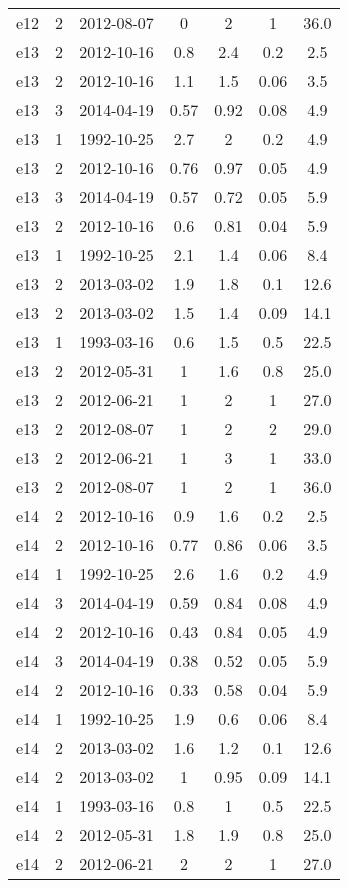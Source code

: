 \begin{longtable}{ccccccc}
e12 & 2 & 2012-08-07 & 0 & 2 & 1 & 36.0 \\
e13 & 2 & 2012-10-16 & 0.8 & 2.4 & 0.2 & 2.5 \\
e13 & 2 & 2012-10-16 & 1.1 & 1.5 & 0.06 & 3.5 \\
e13 & 3 & 2014-04-19 & 0.57 & 0.92 & 0.08 & 4.9 \\
e13 & 1 & 1992-10-25 & 2.7 & 2 & 0.2 & 4.9 \\
e13 & 2 & 2012-10-16 & 0.76 & 0.97 & 0.05 & 4.9 \\
e13 & 3 & 2014-04-19 & 0.57 & 0.72 & 0.05 & 5.9 \\
e13 & 2 & 2012-10-16 & 0.6 & 0.81 & 0.04 & 5.9 \\
e13 & 1 & 1992-10-25 & 2.1 & 1.4 & 0.06 & 8.4 \\
e13 & 2 & 2013-03-02 & 1.9 & 1.8 & 0.1 & 12.6 \\
e13 & 2 & 2013-03-02 & 1.5 & 1.4 & 0.09 & 14.1 \\
e13 & 1 & 1993-03-16 & 0.6 & 1.5 & 0.5 & 22.5 \\
e13 & 2 & 2012-05-31 & 1 & 1.6 & 0.8 & 25.0 \\
e13 & 2 & 2012-06-21 & 1 & 2 & 1 & 27.0 \\
e13 & 2 & 2012-08-07 & 1 & 2 & 2 & 29.0 \\
e13 & 2 & 2012-06-21 & 1 & 3 & 1 & 33.0 \\
e13 & 2 & 2012-08-07 & 1 & 2 & 1 & 36.0 \\
e14 & 2 & 2012-10-16 & 0.9 & 1.6 & 0.2 & 2.5 \\
e14 & 2 & 2012-10-16 & 0.77 & 0.86 & 0.06 & 3.5 \\
e14 & 1 & 1992-10-25 & 2.6 & 1.6 & 0.2 & 4.9 \\
e14 & 3 & 2014-04-19 & 0.59 & 0.84 & 0.08 & 4.9 \\
e14 & 2 & 2012-10-16 & 0.43 & 0.84 & 0.05 & 4.9 \\
e14 & 3 & 2014-04-19 & 0.38 & 0.52 & 0.05 & 5.9 \\
e14 & 2 & 2012-10-16 & 0.33 & 0.58 & 0.04 & 5.9 \\
e14 & 1 & 1992-10-25 & 1.9 & 0.6 & 0.06 & 8.4 \\
e14 & 2 & 2013-03-02 & 1.6 & 1.2 & 0.1 & 12.6 \\
e14 & 2 & 2013-03-02 & 1 & 0.95 & 0.09 & 14.1 \\
e14 & 1 & 1993-03-16 & 0.8 & 1 & 0.5 & 22.5 \\
e14 & 2 & 2012-05-31 & 1.8 & 1.9 & 0.8 & 25.0 \\
e14 & 2 & 2012-06-21 & 2 & 2 & 1 & 27.0 \\

\end{longtable}
